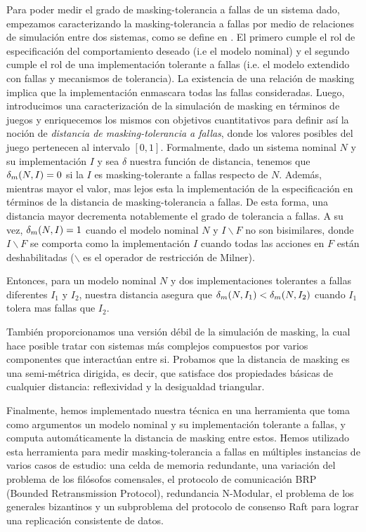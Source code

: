 Para poder medir el grado de masking-tolerancia a fallas de un sistema dado, empezamos caracterizando la masking-tolerancia a fallas por medio de relaciones de simulación entre dos sistemas, como se define en \cite{DemasiCMA17}. El primero cumple el rol de especificación del comportamiento deseado (i.e el modelo nominal) y el segundo cumple el rol de una implementación tolerante a fallas (i.e. el modelo extendido con fallas y mecanismos de tolerancia).
La existencia de una relación de masking implica que la implementación enmascara todas las fallas consideradas. Luego, introducimos una caracterización de la simulación de masking en términos de juegos y enriquecemos los mismos con objetivos cuantitativos para definir así la noción de \emph{distancia de masking-tolerancia a fallas}, donde los valores posibles del juego pertenecen al intervalo  $[0,1]$. 
Formalmente, dado un sistema nominal $N$ y su implementación $I$ y sea $\delta$ nuestra función de distancia, tenemos que $\delta_{m}(N,I)=0$ si la $I$ es masking-tolerante a fallas respecto de $N$. Además, mientras mayor el valor, mas lejos esta la implementación de la especificación en términos de la distancia de masking-tolerancia a fallas. De esta forma, una distancia mayor decrementa notablemente el grado de tolerancia a fallas. A su vez, $\delta_{m}(N,I)=1$ cuando el modelo nominal $N$ y $I\backslash F$ no son bisimilares, donde $I\backslash F$ se comporta como la implementación $I$ cuando todas las acciones en $F$ están deshabilitadas ($\backslash$ es el operador de restricción de Milner).

Entonces, para un modelo nominal $N$ y dos implementaciones tolerantes a fallas diferentes $I_1$ y $I_2$, nuestra distancia asegura que  $\delta_{m}(N,I_1)<\delta_{m}(N,I_2)$ cuando $I_1$ tolera mas fallas que $I_2$.

También proporcionamos una versión débil de la simulación de masking, la cual hace posible tratar con sistemas más complejos compuestos por varios componentes que interactúan entre si. Probamos que la distancia de masking es una semi-métrica dirigida, es decir, que satisface dos propiedades básicas de cualquier distancia: reflexividad y la desigualdad triangular.

Finalmente, hemos implementado nuestra técnica en una herramienta que toma como argumentos un modelo nominal y su implementación tolerante a fallas, y computa automáticamente la distancia de masking entre estos.
Hemos utilizado esta herramienta para medir masking-tolerancia a fallas en múltiples instancias de varios casos de estudio: una celda de memoria redundante, una variación del problema de los filósofos comensales, el protocolo de comunicación BRP (Bounded Retransmission Protocol), redundancia N-Modular, el problema de los generales bizantinos y un subproblema del protocolo de consenso Raft para lograr una replicación consistente de datos.

